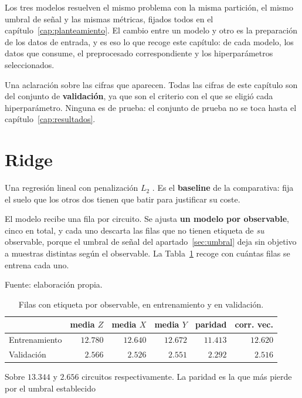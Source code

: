 Los tres modelos resuelven el mismo problema con la misma partición, el mismo umbral de señal
y las mismas métricas, fijados todos en el capítulo~\ref{cap:planteamiento}. El cambio entre un modelo y otro es la preparación de los datos de entrada, y es eso lo que recoge este
capítulo: de cada modelo, los datos que consume, el preprocesado correspondiente y los
hiperparámetros seleccionados.

Una aclaración sobre las cifras que aparecen. Todas las cifras de este capítulo son del conjunto de
\textbf{validación}, ya que son el criterio con el que se eligió cada hiperparámetro. Ninguna
es de prueba: el conjunto de prueba no se toca hasta el capítulo~\ref{cap:resultados}.


\section{Ridge}
\label{sec:sol_ridge}

Una regresión lineal con penalización $L_2$ \cite{hoerl1970ridge}. Es el \textbf{baseline} de
la comparativa: fija el suelo que los otros dos tienen que batir para justificar su coste.

El modelo recibe una fila por circuito. Se ajusta \textbf{un modelo por observable}, cinco en total, y cada uno
descarta las filas que no tienen etiqueta de \emph{su} observable, porque el umbral de señal
del apartado~\ref{sec:umbral} deja sin objetivo a muestras distintas según el observable. La
Tabla~\ref{tab:datos_tabular} recoge con cuántas filas se entrena cada uno.

\begin{table}[htbp]
    \centering
    \caption{Filas con etiqueta por observable, en entrenamiento y en validación.}
    \label{tab:datos_tabular}
    {\footnotesize
    Fuente: elaboración propia. \begin{tabular}{@{}lrrrrr@{}}
        \toprule
        & \textbf{media $Z$} & \textbf{media $X$} & \textbf{media $Y$}
        & \textbf{paridad} & \textbf{corr. vec.} \\
        \midrule
        Entrenamiento & $12{.}780$ & $12{.}640$ & $12{.}672$ & $11{.}413$ & $12{.}620$ \\
        Validación    & $2{.}566$  & $2{.}526$  & $2{.}551$  & $2{.}292$  & $2{.}516$ \\
        \bottomrule
    \end{tabular}}

    {\footnotesize Sobre $13{.}344$ y $2{.}656$ circuitos
    respectivamente. La paridad es la que más pierde por el umbral establecido}
\end{table}

